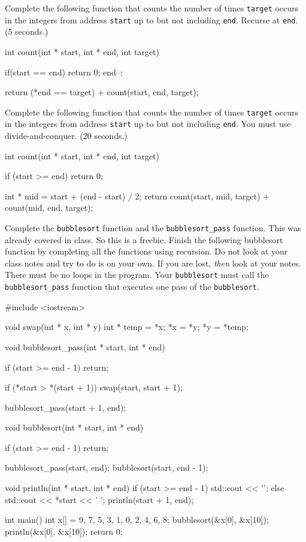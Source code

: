 \nextq
Complete the following function that counts the number of times \verb!target!
occurs in the integers
from address \verb!start! up to but not including \verb!end!.
Recurse at \verb!end!.
(5 seconds.)
\\
\ANSWER
\begin{answercode}
int count(int * start, int * end, int target)
{
  if(start == end) return 0;
  end--;

  return (*end == target) + count(start, end, target);  
}
\end{answercode}

\nextq
Complete the following function that counts the number of times \verb!target!
occurs in the integers
from address \verb!start! up to but not including \verb!end!.
You must use divide-and-conquer.
(20 seconds.)
\\
\ANSWER
\begin{answercode}
int count(int * start, int * end, int target)
{
  if (start >= end) return 0;

  int * mid = start + (end - start) / 2;
  return count(start, mid, target) + count(mid, end, target);
}
\end{answercode}

\nextq
Complete the \verb!bubblesort! function and the \verb!bubblesort_pass!
function.
This was already covered in class. So this is a freebie.
Finish the following bubblesort function by completing all the functions using
recursion.
Do not look at your class notes and try to do is on your own.
If you are lost, \textit{then} look at your notes.
There must be no loops in the program.
Your \verb!bubblesort! must call the \verb!bubblesort_pass! function that
executes one pass of the \verb!bubblesort!.
\\
\ANSWER
\begin{answercode}
#include <iostream>

void swap(int * x, int * y)
{
  int * temp = *x;
  *x = *y;
  *y = *temp;
}

void bubblesort_pass(int * start, int * end)
{
  if (start >= end - 1) return;

  if (*start > *(start + 1)) swap(start, start + 1);

  bubblesort_pass(start + 1, end);
}

void bubblesort(int * start, int * end)
{
  if (start >= end - 1) return;

  bubblesort_pass(start, end);
  bubblesort(start, end - 1);
}

void println(int * start, int * end)
{
    if (start >= end - 1)
    {
        std::cout << '\n';
    }
    else
    {
        std::cout << *start << ' ';
        println(start + 1, end);
    }
}

int main()
{
    int x[] = {9, 7, 5, 3, 1, 0, 2, 4, 6, 8};
    bubblesort(&x[0], &x[10]);
    println(&x[0], &x[10]);
    return 0;
}
\end{answercode}


